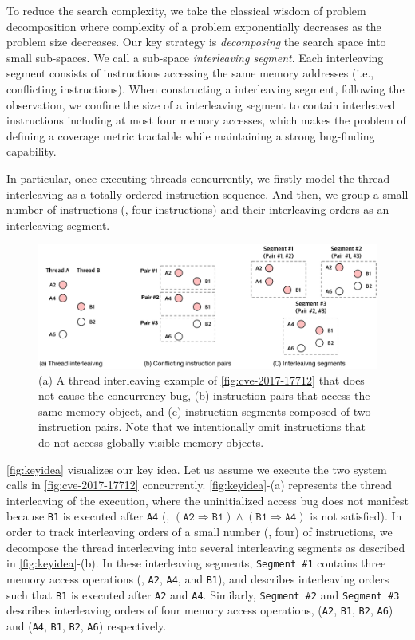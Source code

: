 To reduce the search complexity, we take the classical wisdom of problem decomposition where 
complexity of a problem exponentially decreases as the problem size decreases.
Our key strategy is \textit{decomposing} the search space into 
small sub-spaces. We call a sub-space \textit{interleaving segment}.
Each interleaving segment consists of instructions accessing 
the same memory addresses (i.e., conflicting instructions).
When constructing a interleaving segment, following the observation, 
we confine the size of a interleaving segment 
to contain interleaved instructions including at most four memory accesses,
which makes the problem of defining a coverage metric tractable while maintaining a strong bug-finding capability.

%
In particular, once executing threads concurrently, we firstly model
the thread interleaving as a totally-ordered instruction sequence.
%
And then, we group a small number of instructions (\eg, four
instructions) and their interleaving orders as an interleaving segment.


\begin{figure}[t]
  \centering
  \includegraphics[width=0.9\linewidth]{fig/intuition.pdf}
  \caption{(a) A thread interleaving example of
    \autoref{fig:cve-2017-17712} that does not cause the concurrency
    bug, (b) instruction pairs that access the same memory object,
    and (c) instruction segments composed of two instruction pairs.
    Note that we intentionally omit instructions that do not access
    globally-visible memory objects.}
  \label{fig:keyidea}
\end{figure}
%
\autoref{fig:keyidea} visualizes our key idea.
%
Let us assume we execute the two system calls in
\autoref{fig:cve-2017-17712} concurrently.
%
\autoref{fig:keyidea}-(a) represents the thread interleaving of the
execution, where the uninitialized access bug does not manifest
because \texttt{B1} is executed after \texttt{A4} (\ie,
$(\texttt{A2} \Rightarrow \texttt{B1}) \wedge (\texttt{B1} \Rightarrow
\texttt{A4})$ is not satisfied).
%
In order to track interleaving orders of a small number (\eg, four) of
instructions, we decompose the thread interleaving into several
interleaving segments as described in \autoref{fig:keyidea}-(b).
%
In these interleaving segments, \texttt{Segment \#1} contains three
memory access operations (\ie, \texttt{A2}, \texttt{A4}, and
\texttt{B1}), and describes interleaving orders such that \texttt{B1}
is executed after \texttt{A2} and \texttt{A4}.
%
Similarly, \texttt{Segment \#2} and \texttt{Segment \#3} describes
interleaving orders of four memory access operations, (\texttt{A2},
\texttt{B1}, \texttt{B2}, \texttt{A6}) and (\texttt{A4}, \texttt{B1},
\texttt{B2}, \texttt{A6}) respectively.
%

